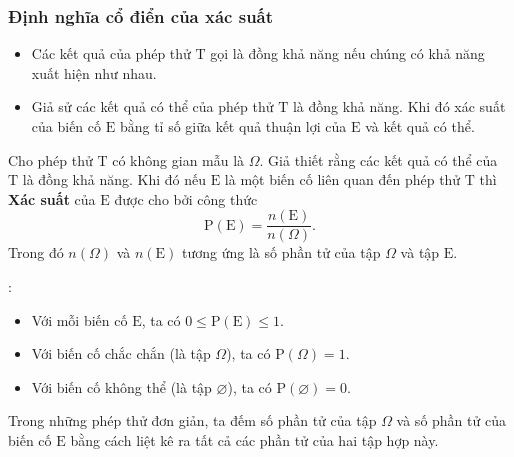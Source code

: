 \subsubsection{Định nghĩa cổ điển của xác suất}
\begin{itemize}
	\item Các kết quả của phép thử $ \mathrm{T} $ gọi là đồng khả năng nếu chúng có khả năng xuất hiện như nhau.
	\item Giả sử các kết quả có thể của phép thử $ \mathrm{T} $  là đồng khả năng. Khi đó xác suất của biến cố $ \mathrm{E} $ bằng tỉ số giữa kết quả thuận lợi của $ \mathrm{E} $ và kết quả có thể.
\end{itemize}
\begin{dn}
		Cho phép thử $ \mathrm{T} $ có không gian mẫu là $ \Omega $. Giả thiết rằng các kết quả có thể của $ \mathrm{T} $ là đồng khả năng. Khi đó nếu $ \mathrm{E} $ là một biến cố liên quan đến phép thử $ \mathrm{T} $ thì {\bf{Xác suất}} của $ \mathrm{E} $ được cho bởi công thức $$\mathrm{P}(\mathrm{E})=\dfrac{n(\mathrm{E})}{n(\Omega)}.$$
	Trong đó $ n(\Omega) $ và $ n(\mathrm{E}) $ tương ứng là số phần tử của tập $ \Omega $ và tập $ \mathrm{E} $.
\end{dn}
: 
\begin{itemize}
	\item Với mỗi biến cố $ \mathrm{E} $, ta có $ 0\leq \mathrm{P}(\mathrm{E})\leq 1 $.
	\item Với biến cố chắc chắn (là tập $ \Omega $), ta có $ \mathrm{P}(\Omega)=1 $.
	\item Với biến cố không thể (là tập $ \varnothing $), ta có $ \mathrm{P}(\varnothing)=0 $.
\end{itemize}
\begin{note}
	Trong những phép thử đơn giản, ta đếm số phần tử của tập $ \Omega $ và số phần tử của biến cố $ \mathrm{E} $ bằng cách liệt kê ra tất cả các phần tử của hai tập hợp này.
\end{note}
